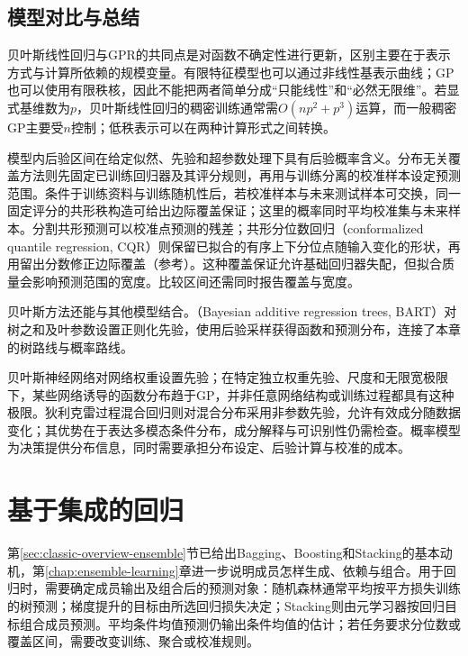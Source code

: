 \subsection{模型对比与总结}

贝叶斯线性回归与GPR的共同点是对函数不确定性进行更新，区别主要在于表示方式与计算所依赖的规模变量。有限特征模型也可以通过非线性基表示曲线；GP也可以使用有限秩核，因此不能把两者简单分成“只能线性”和“必然无限维”。若显式基维数为$p$，贝叶斯线性回归的稠密训练通常需$O(np^2+p^3)$运算，而一般稠密GP主要受$n$控制；低秩表示可以在两种计算形式之间转换。

模型内后验区间在给定似然、先验和超参数处理下具有后验概率含义。分布无关覆盖方法则先固定已训练回归器及其评分规则，再用与训练分离的校准样本设定预测范围。条件于训练资料与训练随机性后，若校准样本与未来测试样本可交换，同一固定评分的共形秩构造可给出边际覆盖保证；这里的概率同时平均校准集与未来样本。分割共形预测可以校准点预测的残差；共形分位数回归（conformalized quantile regression, CQR）则保留已拟合的有序上下分位点随输入变化的形状，再用留出分数修正边际覆盖（参考）。这种覆盖保证允许基础回归器失配，但拟合质量会影响预测范围的宽度。比较区间还需同时报告覆盖与宽度。

贝叶斯方法还能与其他模型结合。（Bayesian additive regression trees, BART）对树之和及叶参数设置正则化先验，使用后验采样获得函数和预测分布，连接了本章的树路线与概率路线。

贝叶斯神经网络对网络权重设置先验；在特定独立权重先验、尺度和无限宽极限下，某些网络诱导的函数分布趋于GP，并非任意网络结构或训练过程都具有这种极限。狄利克雷过程混合回归则对混合分布采用非参数先验，允许有效成分随数据变化；其优势在于表达多模态条件分布，成分解释与可识别性仍需检查。概率模型为决策提供分布信息，同时需要承担分布设定、后验计算与校准的成本。

\section{基于集成的回归}
\label{sec:regression-ensemble}

第\ref{sec:classic-overview-ensemble}节已给出Bagging、Boosting和Stacking的基本动机，第\ref{chap:ensemble-learning}章进一步说明成员怎样生成、依赖与组合。用于回归时，需要确定成员输出及组合后的预测对象：随机森林通常平均按平方损失训练的树预测；梯度提升的目标由所选回归损失决定；Stacking则由元学习器按回归目标组合成员预测。平均条件均值预测仍输出条件均值的估计；若任务要求分位数或覆盖区间，需要改变训练、聚合或校准规则。

